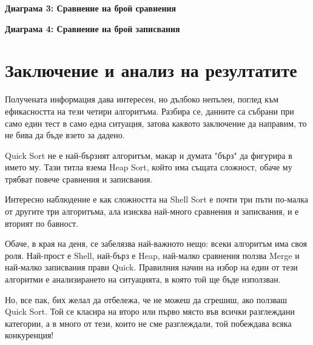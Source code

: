 \documentclass[12pt,a4paper]{article}
\begin{document}
\begin{center}
\textbf{Диаграма 3: Сравнение на брой сравнения}


\textbf{Диаграма 4: Сравнение на брой записвания}
  
\end{center}

\section{Заключение и анализ на резултатите}

Получената информация дава интересен, но дълбоко непълен, поглед към ефикасността на тези четири алгоритъма. 
Разбира се, данните са събрани при само един тест в само една ситуация, затова каквото заключение да направим, то не бива да бъде взето за дадено.

Quick Sort не е най-бързият алгоритъм, макар и думата "бърз" да фигурира в името му. Тази титла взема Heap Sort, който има същата сложност, обаче му трябват повече сравнения и записвания.

Интересно наблюдение е как сложността на Shell Sort е почти три пъти по-малка от другите три алгоритъма, ала изисква най-много сравнения и записвания, и е вторият по бавност.

Обаче, в края на деня, се забелязва най-важното нещо: всеки алгоритъм има своя роля. Най-прост е Shell, най-бърз е Heap, най-малко сравнения ползва Merge и най-малко записвания прави Quick. 
Правилния начин на избор на един от тези алгоритми е анализирането на ситуацията, в която той ще бъде използван.

Но, все пак, бих желал да отбележа, че не можеш да сгрешиш, ако ползваш Quick Sort.
Той се класира на второ или първо място във всички разглеждани категории, а в много от тези, които не сме разглеждали, той побеждава всяка конкуренция!

\newpage

\nocite{*}

\end{document}
